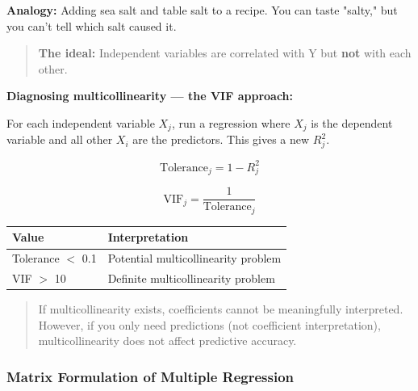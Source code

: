 \documentclass[12pt,openany]{book}
\begin{document}
\textbf{Analogy:} Adding sea salt and table salt to a recipe. You can taste "salty," but you can't tell which salt caused it.

\begin{quote}
\textbf{The ideal:} Independent variables are correlated with Y but \textbf{not} with each other.
\end{quote}


\textbf{Diagnosing multicollinearity --- the VIF approach:}

For each independent variable \(X_j\), run a regression where \(X_j\) is the dependent variable and all other \(X_i\) are the predictors. This gives a new \(R^2_j\).

\[
\text{Tolerance}_j = 1 - R^2_j
\]

\[
\text{VIF}_j = \frac{1}{\text{Tolerance}_j}
\]


\begin{center}
\small
\renewcommand{\arraystretch}{1.15}
\begin{tabular}{|L{0.28\textwidth}|L{0.60\textwidth}|}
\hline
    Value & Interpretation \\
\hline
    Tolerance \(<\) 0.1 & Potential multicollinearity problem \\
\hline
    VIF \(>\) 10 & Definite multicollinearity problem \\
\hline
\end{tabular}
\end{center}
\normalsize


\begin{quote}
If multicollinearity exists, coefficients cannot be meaningfully interpreted. However, if you only need predictions (not coefficient interpretation), multicollinearity does not affect predictive accuracy.
\end{quote}


\medskip




\subsubsection{Matrix Formulation of Multiple Regression}
\end{document}
